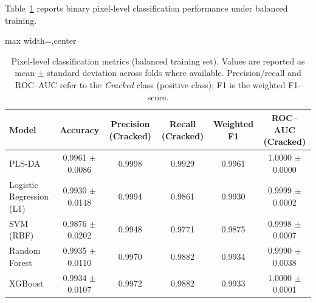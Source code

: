 \noindent
Table~\ref{tab:pixel_metrics_balanced} reports binary pixel-level classification performance under balanced training.

\begin{table}[!htbp]
    \centering
    \caption[Pixel-level classification: balanced binary (full CV)]{Pixel-level classification metrics (balanced training set). Values are reported as mean $\pm$ standard deviation across folds where available. Precision/recall and ROC--AUC refer to the \textit{Cracked} class (positive class); F1 is the weighted F1-score.}
    \label{tab:pixel_metrics_balanced}
    \small
    \renewcommand{\arraystretch}{1.25}
    \setlength{\tabcolsep}{7pt}
    \begin{adjustbox}{max width=\linewidth,center}
    \begin{tabular}{@{}lccccc@{}}
        \toprule
        Model & Accuracy & Precision (Cracked) & Recall (Cracked) & Weighted F1 & ROC--AUC (Cracked) \\
        \midrule
        PLS-DA                    & 0.9961 $\pm$ 0.0086 & 0.9998 & 0.9929 & 0.9961 & 1.0000 $\pm$ 0.0000 \\
        Logistic Regression (L1)  & 0.9930 $\pm$ 0.0148 & 0.9994 & 0.9861 & 0.9930 & 0.9999 $\pm$ 0.0002 \\
        SVM (RBF)                 & 0.9876 $\pm$ 0.0202 & 0.9948 & 0.9771 & 0.9875 & 0.9998 $\pm$ 0.0007 \\
        Random Forest            & 0.9935 $\pm$ 0.0110 & 0.9970 & 0.9882 & 0.9934 & 0.9990 $\pm$ 0.0038 \\
        XGBoost                  & 0.9934 $\pm$ 0.0107 & 0.9972 & 0.9882 & 0.9933 & 1.0000 $\pm$ 0.0001 \\
        \bottomrule
    \end{tabular}
    \end{adjustbox}
\end{table}


